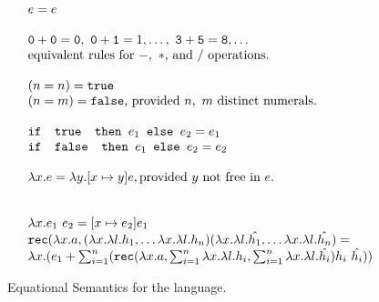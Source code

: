 \begin{figure}
\[
\begin{array}{lr}
e = e \\ \\
\texttt{0} + \texttt{0} = \texttt{0}, \ \texttt{0} + \texttt{1} = 1, \ldots, \ \texttt{3} + \texttt{5} = \texttt{8}, \ldots  \\
\text{equivalent rules for } -, \ * \text{, and } /\text{ operations.}
\\ \\
(n =n) = \texttt{true} \\ (n=m) = \texttt{false}\text{, provided } n, \ m \text{ distinct numerals.}\\ \\ 
\ifelse{\texttt{ true }}{e_1}{e_2} = e_1 \\
\ifelse{\texttt{ false }}{e_1}{e_2} = e_2 \\ \\ 
\lambda x.e = \lambda y.[x \mapsto y]e, \text{provided } y \text{ not free in } e. \\ \\ \\
\lambda x.e_1 \ e_2 = [x \mapsto e_2]e_1 \\
\texttt{rec}(\lambda x.a, ( \lambda x.\lambda l.h_1, \ldots \lambda x.\lambda l.h_n)
( \lambda x.\lambda l.\hat{h_1}, \ldots \lambda x.\lambda l.\hat{h_n})= \\
\lambda x.(e_1 + \sum_{i=1}^n(\texttt{rec}(\lambda x.a, \sum_{i=1}^n \lambda x.\lambda l.h_i, 
\sum_{i=1}^n \lambda x.\lambda l.\hat{h_i}) h_i  \ \hat{h_i}))
\end{array}
\]
\caption{Equational Semantics for the language.}
\label{fig:typing}
\end{figure}

